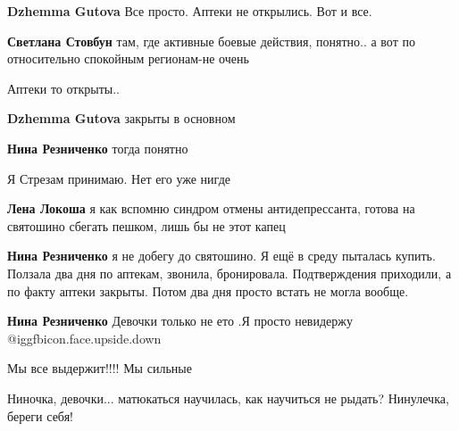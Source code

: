 \begin{itemize}
\begin{itemize} %
\textbf{Dzhemma Gutova} Все просто. Аптеки не открылись. Вот и все.

\textbf{Светлана Стовбун} там, где активные боевые действия, понятно.. а вот по относительно спокойным регионам-не очень

Аптеки то открыты..

\textbf{Dzhemma Gutova} закрыты в основном

\textbf{Нина Резниченко} тогда понятно
\end{itemize} %


Я Стрезам принимаю. Нет его уже нигде

\begin{itemize} %
\textbf{Лена Локоша} я как вспомню синдром отмены антидепрессанта, готова на святошино сбегать пешком, лишь бы не этот капец

\textbf{Нина Резниченко} я не добегу до святошино. Я ещё в среду пыталась купить. Ползала два дня по аптекам, звонила, бронировала. Подтверждения приходили, а по факту аптеки закрыты. Потом два дня просто встать не могла вообще.

\textbf{Нина Резниченко} Девочки только не ето .Я просто невидержу  @igg{fbicon.face.upside.down} 
\end{itemize} %

Мы все выдержит!!!! Мы сильные


Ниночка, девочки... матюкаться научилась, как научиться не рыдать? Нинулечка,
береги себя!


\end{itemize} %
